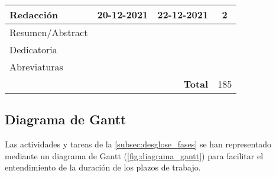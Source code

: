 \begin{longtable}[c]{lcc|c|}
	\multicolumn{1}{|l|}{\textbf{Redacción}}            & \multicolumn{1}{c|}{20-12-2021} & 22-12-2021                          & 2   \\ \hline
	\multicolumn{1}{|l|}{Resumen/Abstract}              & \multicolumn{1}{c|}{}           &                                     &     \\ \hline
	\multicolumn{1}{|l|}{Dedicatoria}                   & \multicolumn{1}{c|}{}           &                                     &     \\ \hline
	\multicolumn{1}{|l|}{Abreviaturas}                  & \multicolumn{1}{c|}{}           &                                     &     \\ \hline
	                                                    & \multicolumn{1}{l}{}            & \multicolumn{1}{r|}{\textbf{Total}} & 185 \\ \cline{4-4}
\end{longtable}

\subsection{Diagrama de Gantt}
Las actividades y tareas de la \autoref{subsec:desglose_fases} se han representado mediante un diagrama de Gantt (\autoref{fig:diagrama_gantt}) para facilitar el entendimiento de la duración de los plazos de trabajo.

